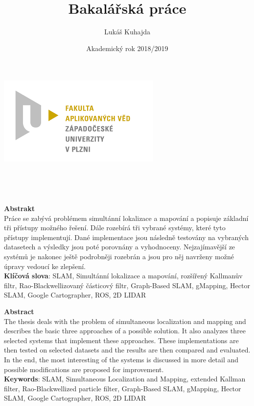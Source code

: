 \documentclass[12pt]{report}
\begin{document}
	
\title{Bakalářská práce}
\author{Lukáš Kuhajda}
\date{Akademický rok 2018/2019}
\begin{titlepage}
	\begin{center}
		\includegraphics[scale=0.5]{logo_zcu}\\
		\vspace{5cm}
		\begin{Large}
			\textbf{\thetitle}\\
		\end{Large}
		
		\vspace{3cm}
		\theauthor\\
		\vspace{5cm}
		\thedate
	\end{center}
\end{titlepage}

\noindent\textbf{\Large{Abstrakt}}\\

\noindent Práce se zabývá problémem simultánní lokalizace a mapování a popisuje základní tři přístupy možného řešení. Dále rozebírá tři vybrané systémy, které tyto přístupy implementují. Dané implementace jsou následně testovány na vybraných datasetech a výsledky jsou poté porovnány a vyhodnoceny. Nejzajímavější ze systémů je nakonec ještě podrobněji rozebrán a jsou pro něj navrženy možné úpravy vedoucí ke zlepšení.\\
\textbf{Klíčová slova}: SLAM, Simultánní lokalizace a mapování, rozšířený Kallmanův filtr, Rao-Blackwellizovaný částicový filtr, Graph-Based SLAM, gMapping, Hector SLAM, Google Cartographer, ROS, 2D LIDAR\\
\newline


\noindent\textbf{\Large{Abstract}}\\

\noindent The thesis deals with the problem of simultaneous localization and mapping and describes the basic three approaches of a possible solution. It also analyzes three selected systems that implement these approaches. These implementations are then tested on selected datasets and the results are then compared and evaluated. In the end, the most interesting of the systems is discussed in more detail and possible modifications are proposed for improvement.\\
\textbf{Keywords}: SLAM, Simultaneous Localization and Mapping, extended Kallman filter, Rao-Blackwellized particle filter, Graph-Based SLAM, gMapping, Hector SLAM, Google Cartographer, ROS, 2D LIDAR
\end{document}

